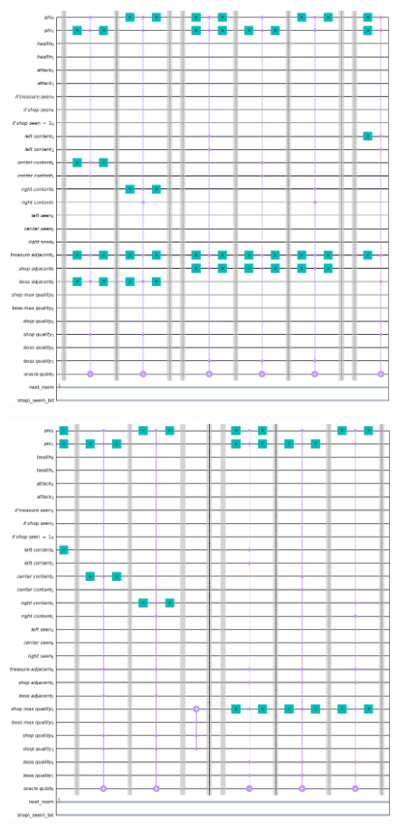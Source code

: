 \documentclass{book}
\theoremstyle{definition}
\theoremstyle{definition}
\theoremstyle{definition}
\theoremstyle{plain}
\theoremstyle{plain}
\theoremstyle{plain}
\theoremstyle{plain}
\begin{document}
\begin{figure}[H]
\begin{center}
    \includegraphics[width=16cm]{immagini_circuito_8_stanze/mega_circ_6.png}
\end{center}
\end{figure}

\begin{figure}[H]
\begin{center}
    \includegraphics[width=16cm]{immagini_circuito_8_stanze/mega_circ_7.png}
\end{center}
\end{figure}
\end{document}
